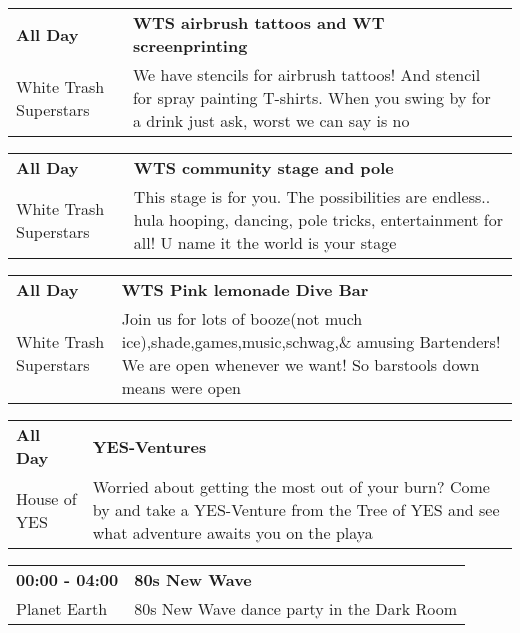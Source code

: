 \begin{tabular}{ p{1in} p{2.2in} }
    \textbf{All Day} & \textbf{WTS airbrush tattoos and WT screenprinting} \\
    White Trash Superstars \newline  & We have stencils for airbrush tattoos! And stencil for spray painting T-shirts. When you swing by for a drink just ask, worst we can say is no \\
    \hline 
\end{tabular}
    
\begin{tabular}{ p{1in} p{2.2in} }
    \textbf{All Day} & \textbf{WTS community stage and pole} \\
    White Trash Superstars \newline  & This stage is for you. The possibilities are endless.. hula hooping,  dancing, pole tricks, entertainment for all! U name it the world is your stage \\
    \hline 
\end{tabular}
    
\begin{tabular}{ p{1in} p{2.2in} }
    \textbf{All Day} & \textbf{WTS Pink lemonade Dive Bar} \\
    White Trash Superstars \newline  & Join us for lots of booze(not much ice),shade,games,music,schwag,\& amusing Bartenders! We are open whenever we want! So barstools down means were open \\
    \hline 
\end{tabular}
    
\begin{tabular}{ p{1in} p{2.2in} }
    \textbf{All Day} & \textbf{YES-Ventures} \\
    House of YES \newline  & Worried about getting the most out of your burn? Come by and take a YES-Venture from the Tree of YES and see what adventure awaits you on the playa \\
    \hline 
\end{tabular}
    
\begin{tabular}{ p{1in} p{2.2in} }
    \textbf{00:00 - 04:00} & \textbf{80s New Wave} \\
    Planet Earth \newline  & 80s New Wave dance party in the Dark Room \\
    \hline 
\end{tabular}
    
